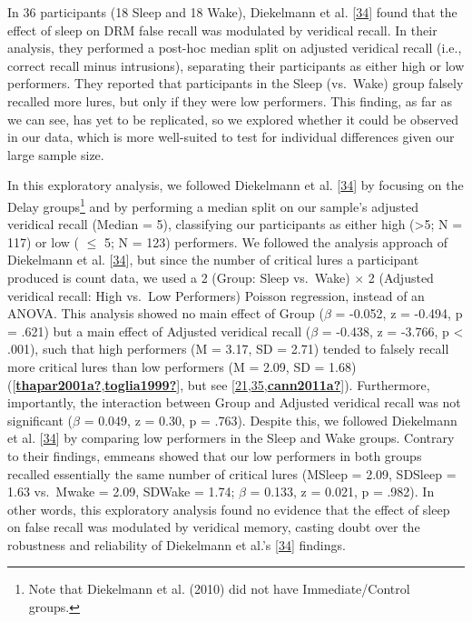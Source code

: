 \documentclass[
]{article}
\begin{document}
In 36 participants (18 Sleep and 18 Wake), Diekelmann et al. {[}\protect\hyperlink{ref-diekelmann2010a}{34}{]} found that the effect of sleep on DRM false recall was modulated by veridical recall. In their analysis, they performed a post-hoc median split on adjusted veridical recall (i.e., correct recall minus intrusions), separating their participants as either high or low performers. They reported that participants in the Sleep (vs.~Wake) group falsely recalled more lures, but only if they were low performers. This finding, as far as we can see, has yet to be replicated, so we explored whether it could be observed in our data, which is more well-suited to test for individual differences given our large sample size.

In this exploratory analysis, we followed Diekelmann et al. {[}\protect\hyperlink{ref-diekelmann2010a}{34}{]} by focusing on the Delay groups\footnote{Note that Diekelmann et al. (2010) did not have Immediate/Control groups.} and by performing a median split on our sample's adjusted veridical recall (Median = 5), classifying our participants as either high (\textgreater5; N = 117) or low ( \(\leq\) 5; N = 123) performers. We followed the analysis approach of Diekelmann et al. {[}\protect\hyperlink{ref-diekelmann2010a}{34}{]}, but since the number of critical lures a participant produced is count data, we used a 2 (Group: Sleep vs.~Wake) \(\times\) 2 (Adjusted veridical recall: High vs.~Low Performers) Poisson regression, instead of an ANOVA. This analysis showed no main effect of Group (\(\beta\) = -0.052, z = -0.494, p = .621) but a main effect of Adjusted veridical recall (\(\beta\) = -0.438, z = -3.766, p \textless{} .001), such that high performers (M = 3.17, SD = 2.71) tended to falsely recall more critical lures than low performers (M = 2.09, SD = 1.68) ({[}\protect\hyperlink{ref-thapar2001a}{\textbf{thapar2001a?}},\protect\hyperlink{ref-toglia1999}{\textbf{toglia1999?}}{]}, but see {[}\protect\hyperlink{ref-roediger2001a}{21},\protect\hyperlink{ref-stadler1999a}{35},\protect\hyperlink{ref-cann2011a}{\textbf{cann2011a?}}{]}). Furthermore, importantly, the interaction between Group and Adjusted veridical recall was not significant (\(\beta\) = 0.049, z = 0.30, p = .763). Despite this, we followed Diekelmann et al. {[}\protect\hyperlink{ref-diekelmann2010a}{34}{]} by comparing low performers in the Sleep and Wake groups. Contrary to their findings, emmeans showed that our low performers in both groups recalled essentially the same number of critical lures (MSleep = 2.09, SDSleep = 1.63 vs.~Mwake = 2.09, SDWake = 1.74; \(\beta\) = 0.133, z = 0.021, p = .982). In other words, this exploratory analysis found no evidence that the effect of sleep on false recall was modulated by veridical memory, casting doubt over the robustness and reliability of Diekelmann et al.'s {[}\protect\hyperlink{ref-diekelmann2010a}{34}{]} findings.
\end{document}
